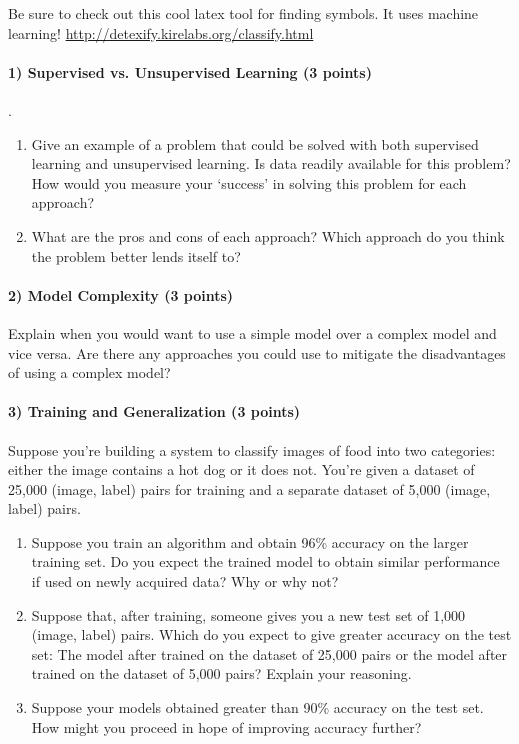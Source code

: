 \documentclass[11pt]{article}
\begin{document}
	Be sure to check out this cool latex tool for finding symbols. It uses machine learning! \url{http://detexify.kirelabs.org/classify.html}
	
	\paragraph{1) Supervised vs. Unsupervised Learning (3 points)}.
	\begin{enumerate}
		\item Give an example of a problem that could be solved with both supervised learning and unsupervised learning. Is data readily available for this problem? How would you measure your `success' in solving this problem for each approach?
		\item What are the pros and cons of each approach? Which approach do you think the problem better lends itself to?
	\end{enumerate}
	
	\paragraph{2) Model Complexity (3 points)} Explain when you would want to use a simple model over a complex model and vice versa. Are there any approaches you could use to mitigate the disadvantages of using a complex model? 
	
	\paragraph{3) Training and Generalization (3 points)} Suppose you're building a system to classify images of food into two categories: either the image contains a hot dog or it does not. You're given a dataset of 25,000 (image, label) pairs for training and a separate dataset of 5,000 (image, label) pairs.
	\begin{enumerate}
		\item Suppose you train an algorithm and obtain 96\% accuracy on the larger training set. Do you expect the trained model to obtain similar performance if used on newly acquired data? Why or why not?
		\item Suppose that, after training, someone gives you a new test set of 1,000 (image, label) pairs. Which do you expect to give greater accuracy on the test set: The model after trained on the dataset of 25,000 pairs or the model after trained on the dataset of 5,000 pairs? Explain your reasoning.
		\item Suppose your models obtained greater than 90\% accuracy on the test set. How might you proceed in hope of improving accuracy further?
	\end{enumerate}
	
\end{document}
